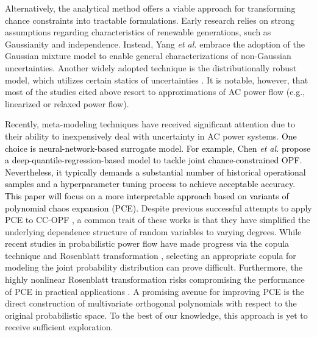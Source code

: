 \documentclass[journal]{IEEEtran}
\theoremstyle{definition}
\theoremstyle{remark}
\begin{document}
Alternatively, the analytical method offers a viable approach for transforming chance constraints into tractable formulations. Early research relies on strong assumptions regarding characteristics of renewable generations, such as Gaussianity and independence. Instead, Yang \textit{et al.} \cite{yang2020analytical} embrace the adoption of the Gaussian mixture model to enable general characterizations of non-Gaussian uncertainties. Another widely adopted technique is the distributionally robust model, which utilizes certain statics of uncertainties \cite{roald2018chance,li2019distribution,arab2022distributionally,arrigo2022embed}. It is notable, however, that most of the studies cited above resort to approximations of AC power flow (e.g., linearized or relaxed power flow).

Recently, meta-modeling techniques have received significant attention due to their ability to inexpensively deal with uncertainty in AC power systems. \textcolor{black}{One choice is neural-network-based surrogate model. For example, Chen \textit{et al.} \cite{chen2023deep} propose a deep-quantile-regression-based model to tackle joint chance-constrained OPF. Nevertheless, it typically demands a substantial number of historical operational samples and a hyperparameter tuning process to achieve acceptable accuracy. This paper will focus on a more interpretable approach based on variants of polynomial chaos expansion (PCE).} Despite previous successful attempts to apply PCE to CC-OPF \cite{li2018compressive,muhlpfordt2019chance,metivier2020efficient,xu2021iterative}, a common trait of these works is that they have simplified the underlying dependence structure of random variables to varying degrees.
While recent studies in probabilistic power flow have made progress via the copula technique and Rosenblatt transformation
 \cite{ye2022generalized,ly2022scalable}, selecting an appropriate copula for modeling the joint probability distribution can prove difficult. Furthermore, the highly nonlinear Rosenblatt transformation risks compromising the performance of PCE in practical applications \cite{lee2022reliability}. A promising avenue for improving PCE is the direct construction of multivariate orthogonal polynomials with respect to the original probabilistic space. To the best of our knowledge, this approach is yet to receive sufficient exploration.
\end{document}
